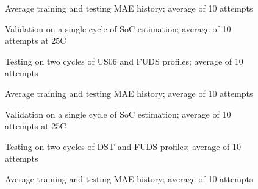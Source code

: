 \begin{figure*}[htbp]
    \centering
    \begin{subfigure}[b]{0.325\textwidth}
        \centering
        
        \caption{Average training and testing MAE history; average of 10 attempts}
    \end{subfigure}
    \hfill
    \begin{subfigure}[b]{0.325\textwidth}
        \centering
        
        \caption{Validation on a single cycle of SoC estimation; average of 10 attempts at 25\textdegree{}C}
    \end{subfigure}
    \hfill
    \begin{subfigure}[b]{0.325\textwidth}
        \centering
        
        \caption{Testing on two cycles of US06 and FUDS profiles; average of 10 attempts}
        \label{subfig:Model-3res-DSTvsFUDS}
    \end{subfigure}
    \begin{subfigure}[b]{0.325\textwidth}
        \centering
        
        \caption{Average training and testing MAE history; average of 10 attempts}
    \end{subfigure}
    \hfill
    \begin{subfigure}[b]{0.325\textwidth}
        \centering
        
        \caption{Validation on a single cycle of SoC estimation; average of 10 attempts at 25\textdegree{}C}
    \end{subfigure}
    \hfill
    \begin{subfigure}[b]{0.325\textwidth}
        \centering
        
        \caption{Testing on two cycles of DST and FUDS profiles; average of 10 attempts}
    \end{subfigure}
    \begin{subfigure}[b]{0.325\textwidth}
        \centering
        
        \caption{Average training and testing MAE history; average of 10 attempts}

\end{subfigure}
\end{figure*}

